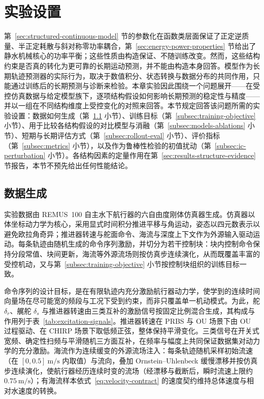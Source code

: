 \section{实验设置}
\label{sec:training-baselines-protocol}

第~\ref{sec:structured-continuous-model} 节的参数化在函数类层面保证了正定逆质量、半正定耗散与斜对称零功率耦合，第~\ref{sec:energy-power-properties} 节给出了静水机械核心的功率平衡；这些性质由构造保证、不随训练改变。然而，这些结构约束是否真的转化为更可靠的长期运动预测，并不能由构造本身回答。模型作为长期轨迹预测器的实际行为，取决于数值积分、状态转换与数据分布的共同作用，只能通过训练后的长期预测与诊断来检验。本章实验因此围绕一个问题展开——在受控仿真数据与给定模型族下，逐项结构假设如何影响长期预测的稳定性与精度——并以一组在不同结构维度上受控变化的对照来回答。本节规定回答该问题所需的实验设置：数据如何生成（第~\ref{subsec:data-generation} 小节）、训练目标（第~\ref{subsec:training-objective} 小节）、用于比较各结构假设的对比模型与消融（第~\ref{subsec:models-ablations} 小节）、短期与长期评估方式（第~\ref{subsec:rollout-eval} 小节）、评价指标（第~\ref{subsec:metrics} 小节），以及作为鲁棒性检验的初值扰动（第~\ref{subsec:ic-perturbation} 小节）。各结构因素的定量作用在第~\ref{sec:results-structure-evidence} 节报告，本节不预先给出任何性能结论。

\subsection{数据生成}
\label{subsec:data-generation}

实验数据由 REMUS~100 自主水下航行器的六自由度刚体仿真器生成。仿真器以体坐标动力学为核心，采用显式时间积分推进平移与角运动，姿态以四元数表示以避免欧拉角奇异；推进器转速与舵面命令、海流与深度上下文作为外源输入驱动运动。每条轨迹由随机生成的命令序列激励，并切分为若干控制块：块内控制命令保持分段常值、块间更新，海流等外源流场则按仿真步连续演化，从而既覆盖丰富的受控机动，又与第~\ref{subsec:training-objective} 小节按控制块组织的训练目标一致。

命令序列的设计目标，是在有限轨迹内充分激励航行器动力学，使学到的连续时间向量场在尽可能宽的频段与工况下受到约束，而非只覆盖单一机动模式。为此，舵 \(\delta_r\)、艉舵 \(\delta_s\) 与推进器转速由三类互补的激励信号按固定比例混合生成，其构成与作用列于表~\ref{tab:excitation-signals}。推进器转速在 PRBS 与 OU 场景下由 OU 过程驱动、在 CHIRP 场景下取低频正弦，整体保持平滑变化。三类信号在开关式宽频、确定性扫频与平滑随机三方面互补，在频率与幅度上共同保证数据集对动力学的充分激励。海流作为连续缓变的外源流场注入：每条轨迹随机采样初始流速（在 \([0,0.5]~\mathrm{m/s}\) 内取值）与流向，叠加 Ornstein--Uhlenbeck 缓慢漂移并按仿真步连续演化，使航行器经历连续时变的流场（经漂移与截断后，瞬时流速上限约 \(0.75~\mathrm{m/s}\)）；有海流样本依式~\eqref{eq:velocity-contract} 的速度契约维持总体速度与相对水速度的转换。

